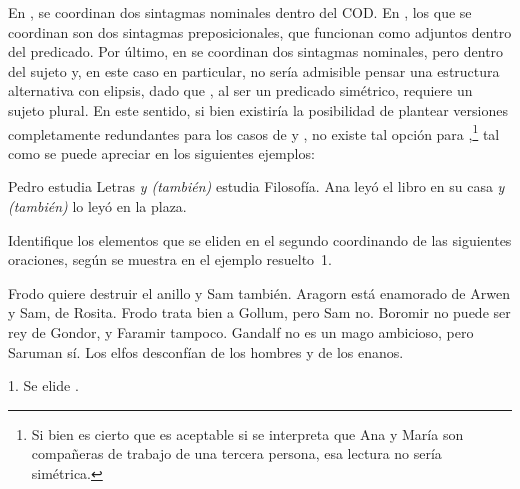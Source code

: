 En , se coordinan dos sintagmas nominales dentro del COD.
En , los que se coordinan son dos sintagmas
preposicionales, que funcionan como adjuntos dentro del predicado. Por último, en
 se coordinan dos sintagmas nominales, pero dentro del
sujeto y, en este caso en particular, no sería admisible pensar una estructura
alternativa con elipsis, dado que , al ser un predicado
simétrico, requiere un sujeto plural. En este sentido, si bien existiría la
posibilidad de plantear versiones completamente redundantes para los casos de
 y , no existe tal opción para
,\footnote{Si bien es cierto que
 es aceptable si se interpreta que Ana y María son
compañeras de trabajo de una tercera persona, esa lectura no sería simétrica.}
tal como se puede apreciar en los siguientes ejemplos:

\begin{exe}
  \ex
    \begin{xlist}
      \ex Pedro estudia Letras \textit{y (también)} estudia Filosofía.
      \ex Ana leyó el libro en su casa \textit{y (también)} lo leyó en la plaza.
    \end{xlist}
\end{exe}

\begin{ejercicio}\label{ej:12-elipsis}
Identifique los elementos que se eliden en el segundo coordinando de las
siguientes oraciones, según se muestra en el ejemplo resuelto~1.

\begin{exe}
  \ex Frodo quiere destruir el anillo y Sam también.
  \ex Aragorn está enamorado de Arwen y Sam, de Rosita.
  \ex Frodo trata bien a Gollum, pero Sam no.
  \ex Boromir no puede ser rey de Gondor, y Faramir tampoco.
  \ex Gandalf no es un mago ambicioso, pero Saruman sí.
  \ex Los elfos desconfían de los hombres y de los enanos.
\end{exe}

\begin{resuelto}
1. Se elide .
\end{resuelto}
\end{ejercicio}

